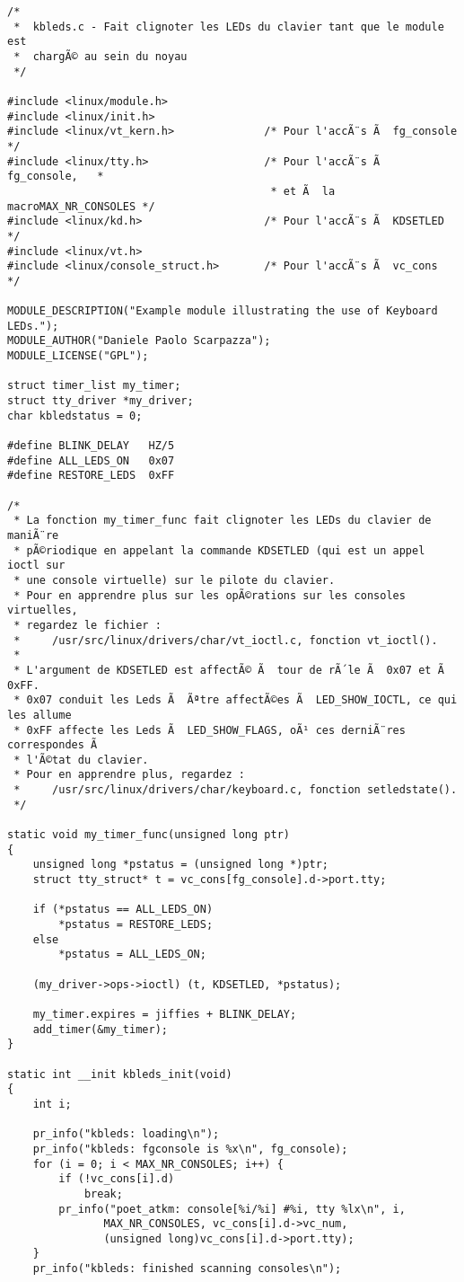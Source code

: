 \documentclass[11pt]{article}
\begin{document}
\begin{verbatim}
/*
 *  kbleds.c - Fait clignoter les LEDs du clavier tant que le module est
 *  chargÃ© au sein du noyau
 */

#include <linux/module.h>
#include <linux/init.h>
#include <linux/vt_kern.h>              /* Pour l'accÃ¨s Ã  fg_console    */
#include <linux/tty.h>                  /* Pour l'accÃ¨s Ã  fg_console,   *
                                         * et Ã  la macroMAX_NR_CONSOLES */
#include <linux/kd.h>                   /* Pour l'accÃ¨s Ã  KDSETLED      */
#include <linux/vt.h>
#include <linux/console_struct.h>       /* Pour l'accÃ¨s Ã  vc_cons       */

MODULE_DESCRIPTION("Example module illustrating the use of Keyboard LEDs.");
MODULE_AUTHOR("Daniele Paolo Scarpazza");
MODULE_LICENSE("GPL");

struct timer_list my_timer;
struct tty_driver *my_driver;
char kbledstatus = 0;

#define BLINK_DELAY   HZ/5
#define ALL_LEDS_ON   0x07
#define RESTORE_LEDS  0xFF

/*
 * La fonction my_timer_func fait clignoter les LEDs du clavier de maniÃ¨re
 * pÃ©riodique en appelant la commande KDSETLED (qui est un appel ioctl sur
 * une console virtuelle) sur le pilote du clavier.
 * Pour en apprendre plus sur les opÃ©rations sur les consoles virtuelles,
 * regardez le fichier :
 *     /usr/src/linux/drivers/char/vt_ioctl.c, fonction vt_ioctl().
 *
 * L'argument de KDSETLED est affectÃ© Ã  tour de rÃ´le Ã  0x07 et Ã  0xFF.
 * 0x07 conduit les Leds Ã  Ãªtre affectÃ©es Ã  LED_SHOW_IOCTL, ce qui les allume
 * 0xFF affecte les Leds Ã  LED_SHOW_FLAGS, oÃ¹ ces derniÃ¨res correspondes Ã
 * l'Ã©tat du clavier.
 * Pour en apprendre plus, regardez :
 *     /usr/src/linux/drivers/char/keyboard.c, fonction setledstate().
 */

static void my_timer_func(unsigned long ptr)
{
    unsigned long *pstatus = (unsigned long *)ptr;
    struct tty_struct* t = vc_cons[fg_console].d->port.tty;

    if (*pstatus == ALL_LEDS_ON)
        *pstatus = RESTORE_LEDS;
    else
        *pstatus = ALL_LEDS_ON;

    (my_driver->ops->ioctl) (t, KDSETLED, *pstatus);

    my_timer.expires = jiffies + BLINK_DELAY;
    add_timer(&my_timer);
}

static int __init kbleds_init(void)
{
    int i;

    pr_info("kbleds: loading\n");
    pr_info("kbleds: fgconsole is %x\n", fg_console);
    for (i = 0; i < MAX_NR_CONSOLES; i++) {
        if (!vc_cons[i].d)
            break;
        pr_info("poet_atkm: console[%i/%i] #%i, tty %lx\n", i,
               MAX_NR_CONSOLES, vc_cons[i].d->vc_num,
               (unsigned long)vc_cons[i].d->port.tty);
    }
    pr_info("kbleds: finished scanning consoles\n");


\end{verbatim}
\end{document}
